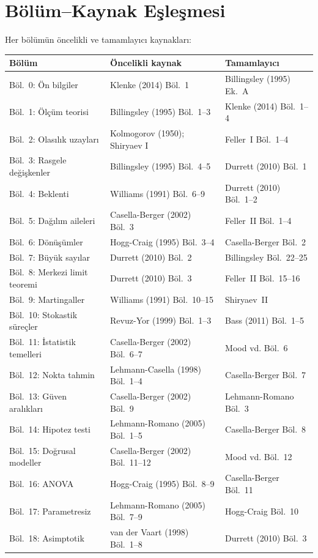 \section{Bölüm--Kaynak Eşleşmesi}

Her bölümün öncelikli ve tamamlayıcı kaynakları:

\begin{center}
\renewcommand{\arraystretch}{1.5}
\small
\begin{tabular}{p{3.5cm}p{4.5cm}p{4.5cm}}
\hline
\textbf{Bölüm} & \textbf{Öncelikli kaynak} & \textbf{Tamamlayıcı} \\
\hline
Böl.~0: Ön bilgiler & Klenke (2014) Böl.~1 & Billingsley (1995) Ek.~A \\
Böl.~1: Ölçüm teorisi & Billingsley (1995) Böl.~1--3 & Klenke (2014) Böl.~1--4 \\
Böl.~2: Olasılık uzayları & Kolmogorov (1950); Shiryaev I & Feller~I Böl.~1--4 \\
Böl.~3: Rasgele değişkenler & Billingsley (1995) Böl.~4--5 & Durrett (2010) Böl.~1 \\
Böl.~4: Beklenti & Williams (1991) Böl.~6--9 & Durrett (2010) Böl.~1--2 \\
Böl.~5: Dağılım aileleri & Casella-Berger (2002) Böl.~3 & Feller~II Böl.~1--4 \\
Böl.~6: Dönüşümler & Hogg-Craig (1995) Böl.~3--4 & Casella-Berger Böl.~2 \\
Böl.~7: Büyük sayılar & Durrett (2010) Böl.~2 & Billingsley Böl.~22--25 \\
Böl.~8: Merkezi limit teoremi & Durrett (2010) Böl.~3 & Feller~II Böl.~15--16 \\
Böl.~9: Martingaller & Williams (1991) Böl.~10--15 & Shiryaev~II \\
Böl.~10: Stokastik süreçler & Revuz-Yor (1999) Böl.~1--3 & Bass (2011) Böl.~1--5 \\
Böl.~11: İstatistik temelleri & Casella-Berger (2002) Böl.~6--7 & Mood vd. Böl.~6 \\
Böl.~12: Nokta tahmin & Lehmann-Casella (1998) Böl.~1--4 & Casella-Berger Böl.~7 \\
Böl.~13: Güven aralıkları & Casella-Berger (2002) Böl.~9 & Lehmann-Romano Böl.~3 \\
Böl.~14: Hipotez testi & Lehmann-Romano (2005) Böl.~1--5 & Casella-Berger Böl.~8 \\
Böl.~15: Doğrusal modeller & Casella-Berger (2002) Böl.~11--12 & Mood vd. Böl.~12 \\
Böl.~16: ANOVA & Hogg-Craig (1995) Böl.~8--9 & Casella-Berger Böl.~11 \\
Böl.~17: Parametresiz & Lehmann-Romano (2005) Böl.~7--9 & Hogg-Craig Böl.~10 \\
Böl.~18: Asimptotik & van der Vaart (1998) Böl.~1--8 & Durrett (2010) Böl.~3 \\
\hline
\end{tabular}
\end{center}

